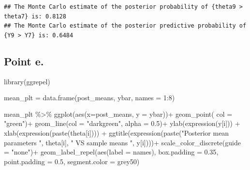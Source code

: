 \documentclass[
  11pt,
]{article}
\newenvironment{Shaded}{\begin{snugshade}}{\end{snugshade}}
\newcommand{\AttributeTok}[1]{\textcolor[rgb]{0.77,0.63,0.00}{#1}}
\newcommand{\DecValTok}[1]{\textcolor[rgb]{0.00,0.00,0.81}{#1}}
\newcommand{\FloatTok}[1]{\textcolor[rgb]{0.00,0.00,0.81}{#1}}
\newcommand{\FunctionTok}[1]{\textcolor[rgb]{0.00,0.00,0.00}{#1}}
\newcommand{\NormalTok}[1]{#1}
\newcommand{\OtherTok}[1]{\textcolor[rgb]{0.56,0.35,0.01}{#1}}
\newcommand{\SpecialCharTok}[1]{\textcolor[rgb]{0.00,0.00,0.00}{#1}}
\newcommand{\StringTok}[1]{\textcolor[rgb]{0.31,0.60,0.02}{#1}}
\begin{document}
\begin{verbatim}
## The Monte Carlo estimate of the posterior probability of {theta9 > theta7} is: 0.8128 
## The Monte Carlo estimate of the posterior predictive probability of {Y9 > Y7} is: 0.6484
\end{verbatim}

\normalsize

\hypertarget{point-e.}{%
\subsection{Point e.}\label{point-e.}}

\scriptsize

\begin{Shaded}
\begin{Highlighting}[]
\FunctionTok{library}\NormalTok{(ggrepel)}

\NormalTok{mean\_plt }\OtherTok{=} \FunctionTok{data.frame}\NormalTok{(post\_means, ybar, }\AttributeTok{names =} \DecValTok{1}\SpecialCharTok{:}\DecValTok{8}\NormalTok{)}

\NormalTok{mean\_plt }\SpecialCharTok{\%\textgreater{}\%} \FunctionTok{ggplot}\NormalTok{(}\FunctionTok{aes}\NormalTok{(}\AttributeTok{x=}\NormalTok{post\_means, }\AttributeTok{y =}\NormalTok{ ybar))}\SpecialCharTok{+}
  \FunctionTok{geom\_point}\NormalTok{( }\AttributeTok{col =} \StringTok{"green"}\NormalTok{)}\SpecialCharTok{+}
  \FunctionTok{geom\_line}\NormalTok{(}\AttributeTok{col =} \StringTok{"darkgreen"}\NormalTok{, }\AttributeTok{alpha =} \FloatTok{0.5}\NormalTok{)}\SpecialCharTok{+}
  \FunctionTok{ylab}\NormalTok{(}\FunctionTok{expression}\NormalTok{(y[i])) }\SpecialCharTok{+}
  \FunctionTok{xlab}\NormalTok{(}\FunctionTok{expression}\NormalTok{(}\FunctionTok{paste}\NormalTok{(theta[i]))) }\SpecialCharTok{+}
  \FunctionTok{ggtitle}\NormalTok{(}\FunctionTok{expression}\NormalTok{(}\FunctionTok{paste}\NormalTok{(}\StringTok{"Posterior mean parameters "}\NormalTok{, theta[i], }\StringTok{" VS sample means "}\NormalTok{, y[i])))}\SpecialCharTok{+}
  \FunctionTok{scale\_color\_discrete}\NormalTok{(}\AttributeTok{guide =} \StringTok{"none"}\NormalTok{)}\SpecialCharTok{+}
  \FunctionTok{geom\_label\_repel}\NormalTok{(}\FunctionTok{aes}\NormalTok{(}\AttributeTok{label =}\NormalTok{ names),}
                  \AttributeTok{box.padding   =} \FloatTok{0.35}\NormalTok{, }
                  \AttributeTok{point.padding =} \FloatTok{0.5}\NormalTok{,}
                  \AttributeTok{segment.color =} \StringTok{\textquotesingle{}grey50\textquotesingle{}}\NormalTok{)}
\end{Highlighting}
\end{Shaded}
\end{document}
